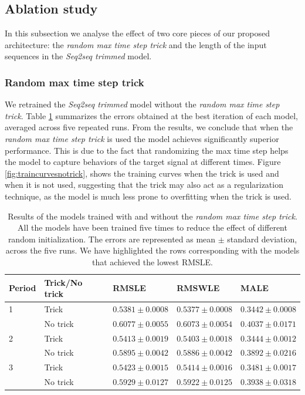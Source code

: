 \subsection{Ablation study}
In this subsection we analyse the effect of two core pieces of our proposed architecture: the \textit{random max time step trick} and the length of the  input sequences in the \textit{Seq2seq trimmed} model.

\subsubsection{Random max time step trick}
We retrained the \textit{Seq2seq trimmed} model without the \textit{random max time step trick}. Table \ref{tab:salesforecast_results_notrick} summarizes the errors obtained at the best iteration of each model, averaged across five repeated runs. From the results, we conclude that when the \textit{random max time step trick} is used the model achieves significantly superior performance. This is due to the fact that randomizing the max time step helps the model to capture behaviors of the target signal at different times. Figure \ref{fig:traincurvesnotrick}, shows the training curves when the trick is used and when it is not used, suggesting that the trick may also act as a regularization technique, as the model is much less prone to overfitting when the trick is used.

	\begin{table}[h]
	\footnotesize
	\caption{Results of the models trained with and without the \textit{random max time step trick}. All the models have been trained five times to reduce the effect of different random initialization. The errors are represented as mean $\pm$ standard deviation, across the five runs. We have highlighted the rows corresponding with the models that achieved the lowest RMSLE.}
	\label{tab:salesforecast_results_notrick}
	\centering
	\begin{tabular}{lllll}
		\hline
		Period & Trick/No trick             & RMSLE                 & RMSWLE                & MALE                  \\ \hline
		1 & Trick   & $ \mathbf{0.5381 \pm 0.0008} $ & $ \mathbf{0.5377 \pm 0.0008} $ & $ \mathbf{0.3442 \pm 0.0008} $ \\
		& No trick & $ 0.6077 \pm 0.0055 $  &  $ 0.6073 \pm 0.0054 $  &  $ 0.4037 \pm 0.0171 $ \\
		\hline
		2 & Trick  & $ \mathbf{0.5413 \pm 0.0019} $ & $ \mathbf{0.5403 \pm 0.0018} $ & $ \mathbf{0.3444 \pm 0.0012} $ \\
		& No trick & $ 0.5895 \pm 0.0042 $  &  $ 0.5886 \pm 0.0042 $  &  $ 0.3892 \pm 0.0216 $ \\
		\hline
		3 & Trick  & $ \mathbf{0.5423 \pm 0.0015} $ & $ \mathbf{0.5414 \pm 0.0016} $ & $ \mathbf{0.3481 \pm 0.0017} $ \\
		& No trick & $ 0.5929 \pm 0.0127 $  &  $ 0.5922 \pm 0.0125 $  &  $ 0.3938 \pm 0.0318 $ \\
		\hline
	\end{tabular}
\end{table}

